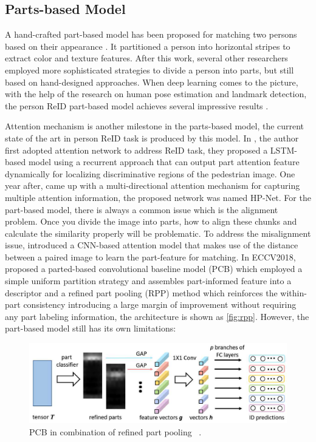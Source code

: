 \subsection{Parts-based Model}

A hand-crafted part-based model has been proposed for matching 
two persons based on their appearance \cite{hand-crafted-part-based}.
It partitioned a person into horizontal stripes to extract color and texture 
features. After this work, several other researchers \cite{part-based-pictorial-structure, part-based-triangle} employed more sophisticated strategies to 
divide a person into parts, but still based on hand-designed approaches. 
When deep learning comes to the picture, with the help of the
research on human pose estimation and landmark detection, the person ReID 
part-based model achieves several impressive results \cite{pose-driven-dcnn-for-reid, deep-part-based-glad, pose-invariant-embedding-for-reid}.

Attention mechanism is another milestone in the parts-based model, the current 
state of the art in person ReID task is 
produced by this model. 
In \cite{end-to-end-attention-network-for-reid}, the author first adopted
attention network to address ReID task, they proposed a LSTM-based
model using a recurrent approach that can output part attention feature 
dynamically for localizing discriminative regions of the pedestrian image. One 
year after, \cite{hpnet-attentive-deep-feature-for-reid} came up with a 
multi-directional attention mechanism for capturing multiple attention
information, the proposed network was named HP-Net.
For the part-based model, there is always a common issue which is the alignment 
problem. Once you divide the image into parts, how to align these chunks and 
calculate the similarity properly will be problematic. To address the 
misalignment issue, \cite{part-aligned-for-reid} introduced a CNN-based 
attention model that makes use of the distance between a paired image to
learn the part-feature for matching. In ECCV2018, \cite{pcb-and-rpp-for-reid} 
proposed a parted-based convolutional baseline model (PCB) which employed a 
simple uniform partition strategy and assembles part-informed feature into a 
descriptor and a refined part pooling (RPP) method which reinforces the 
within-part consistency introducing a large margin of improvement without 
requiring any part labeling information, the architecture is shown as 
\autoref{fig:rpp}. However, the part-based model still has its own limitations:

\begin{figure}
    \includegraphics[width=\linewidth]{figures/rpp.png}
    \caption{PCB in combination of refined part pooling ~\protect \cite{pcb-and-rpp-for-reid}.}
    \label{fig:rpp}
\end{figure}


